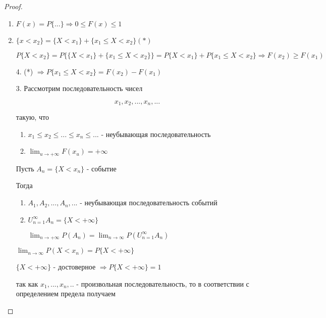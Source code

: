 \documentclass[a4paper, 14pt]{report}
\begin{document}
\begin{proof}

    \hfill

    \begin{enumerate}
        \item $F(x) = P\{...\} \Rightarrow 0 \le F(x) \le 1$

        \item $\{x < x_2\} = \{X < x_1\} + \{x_1 \le X < x_2\} (*)$

            $$
            P\{X < x_2\} = P \big\{ \{X<x_1\} + \{x_1 \le X < x_2 \} \big\} = P\{X < x_1\} + P\{x_1 \le X < x_2\} \Rightarrow F(x_2) \geq F(x_1)
            $$

        \item[4.] (*) $\Rightarrow P\{x_1 \le X < x_2\} = F(x_2) - F(x_1)$
             \item[3.] Рассмотрим последовательность чисел

            $$
            x_1, x_2, ..., x_n, ...
            $$

            такую, что

            \begin{enumerate}
                \item $x_1 \le x_2 \le ... \le x_n \le ...$ - неубывающая последовательность
                \item $\lim_{u \to + \infty} F(x_u) = + \infty$
            \end{enumerate}

            Пусть $A_n = \{ X < x_n \}$ - событие

            Тогда

            \begin{enumerate}
                \item $A_1, A_2, ..., A_n, ...$ - неубывающая последовательность событий
                \item $U_{n=1}^{\infty} A_n = \{ X < +\infty \}$

                    $\lim_{n \to + \infty} P(A_n) = \lim_{n \to \infty} P(U_{n=1}^\infty A_n)$ 
            \end{enumerate}
            
            $\lim_{n \to \infty} P(X < x_n) = P\{X < + \infty \}$

            $\{X < + \infty\}$ - достоверное $\Rightarrow P\{X<+\infty\} = 1$

            так как $x_1,...,x_n,..$ - произвольная последовательность, то в соответствии с
            определением предела получаем


\end{enumerate}
\end{proof}
\end{document}
